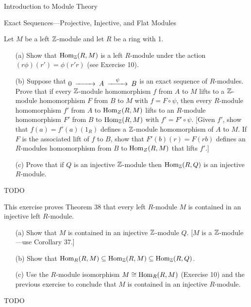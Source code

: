 \begin{chapter}{Introduction to Module Theory}
\begin{section}{Exact Sequences---Projective, Injective, and Flat Modules}
\begin{problem}\label{ex:10.5.15}
Let $M$ be a left $\mathbb{Z}$-module and let $R$ be a ring with 1. 
\begin{enumerate}
\item[(a)] Show that $\operatorname{Hom}_{\mathbb{Z}}(R,M)$ is a left $R$-module under the action $(r\phi)(r') = \phi(r'r)$ (see Exercise 10). 
\item[(b)] Suppose that $\begin{CD}0@>>>A@>\psi>>B\end{CD}$ is an exact sequence of $R$-modules. Prove that if every $\mathbb{Z}$-module homomorphism $f$ from $A$ to $M$ lifts to a $\mathbb{Z}$-module homomorphism $F$ from $B$ to $M$ with $f=F\circ\psi$, then every $R$-module homomorphism $f'$ from $A$ to $\operatorname{Hom}_Z(R,M)$ lifts to an $R$-module homomorphism $F'$ from $B$ to $\operatorname{Hom}_{\mathbb{Z}}(R,M)$ with $f' = F'\circ \psi$. [Given $f'$, show that $f(a) = f'(a)(1_R)$ defines a $\mathbb{Z}$-module homomorphism of $A$ to $M$. If $F$ is the associated lift of $f$ to $B$, show that $F'(b)(r) = F(rb)$ defines an $R$-modules homomorphism from $B$ to $\operatorname{Hom}_Z(R,M)$ that lifts $f'$.]
\item[(c)] Prove that if $Q$ is an injective $\mathbb{Z}$-module then $\operatorname{Hom}_{\mathbb{Z}}(R,Q)$ is an injective $R$-module. 
\end{enumerate}
\end{problem}
\begin{solution}TODO

\end{solution}\oneperpage



\begin{problem}\label{ex:10.5.16}
This exercise proves Theorem 38 that every left $R$-module $M$ is contained in an injective left $R$-module.
\begin{enumerate}
\item[(a)] Show that $M$ is contained in an injective $\mathbb{Z}$-module $Q$. [$M$ is a $\mathbb{Z}$-module---use Corollary 37.]
\item[(b)] Show that $\operatorname{Hom}_R(R,M)\subseteq\operatorname{Hom}_{\mathbb{Z}}(R,M)\subseteq \operatorname{Hom}_{\mathbb{Z}}(R,Q)$.
\item[(c)]  Use the $R$-module isomorphism $M\cong\operatorname{Hom}_R(R,M)$ (Exercise 10) and the previous exercise to conclude that $M$ is contained in an injective $R$-module.
\end{enumerate}
\end{problem}
\begin{solution}TODO

\end{solution}\oneperpage




\end{section}
\end{chapter}
